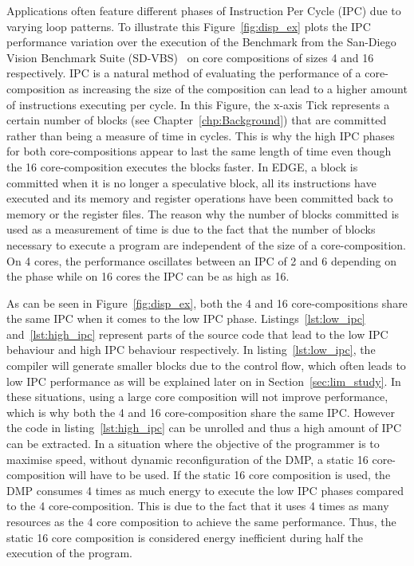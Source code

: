 Applications often feature different phases of Instruction Per Cycle (IPC) due to varying loop patterns.
To illustrate this Figure~\ref{fig:disp_ex} plots the IPC performance variation over the execution of the  Benchmark from the San-Diego Vision Benchmark Suite (SD-VBS)~\cite{sdvbs} on core compositions of sizes 4 and 16 respectively.
IPC is a natural method of evaluating the performance of a core-composition as increasing the size of the composition can lead to a higher amount of instructions executing per cycle.
In this Figure, the x-axis Tick represents a certain number of blocks (see Chapter~\ref{chp:Background}) that are committed rather than being a measure of time in cycles.
This is why the high IPC phases for both core-compositions appear to last the same length of time even though the 16 core-composition executes the blocks faster.
In EDGE, a block is committed when it is no longer a speculative block, all its instructions have executed and its memory and register operations have been committed back to memory or the register files.
The reason why the number of blocks committed is used as a measurement of time is due to the fact that the number of blocks necessary to execute a program are independent of the size of a core-composition.
On 4 cores, the performance oscillates between an IPC of 2 and 6 depending on the phase while on 16 cores the IPC can be as high as 16.

As can be seen in Figure~\ref{fig:disp_ex}, both the 4 and 16 core-compositions share the same IPC when it comes to the low IPC phase.
Listings~\ref{lst:low_ipc} and~\ref{lst:high_ipc} represent parts of the source code that lead to the low IPC behaviour and high IPC behaviour respectively.
In listing~\ref{lst:low_ipc}, the compiler will generate smaller blocks due to the control flow, which often leads to low IPC performance as will be explained later on in Section~\ref{sec:lim_study}.
In these situations, using a large core composition will not improve performance, which is why both the 4 and 16 core-composition share the same IPC.
However the code in listing~\ref{lst:high_ipc} can be unrolled and thus a high amount of IPC can be extracted.
In a situation where the objective of the programmer is to maximise speed, without dynamic reconfiguration of the DMP, a static 16 core-composition will have to be used.
If the static 16 core composition is used, the DMP consumes 4 times as much energy to execute the low IPC phases compared to the 4 core-composition.
This is due to the fact that it uses 4 times as many resources as the 4 core composition to achieve the same performance.
Thus, the static 16 core composition is considered energy inefficient during half the execution of the program.

